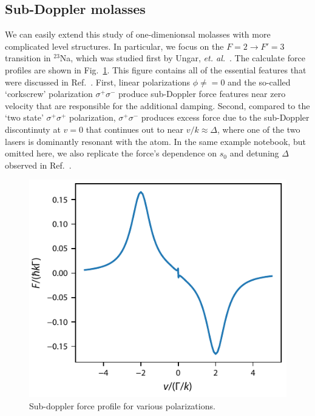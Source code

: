 \documentclass[final,5p,times,twocolumn]{elsarticle}
\begin{document}
\subsection{Sub-Doppler molasses}
We can easily extend this study of one-dimenionsal molasses with more complicated level structures.  In particular, we focus on the $F=2\rightarrow F'=3$ transition in $^{23}$Na, which was studied first by Ungar, {\it et. al.}~\cite{Ungar1989}.  The calculate force profiles are shown in Fig.~\ref{fig:sub_doppler_force}.  This figure contains all of the essential features that were discussed in Ref.~\cite{Ungar1989}.  First, linear polarizations $\phi\neq=0$ and the so-called `corkscrew' polarization $\sigma^+\sigma^-$ produce sub-Doppler force features near zero velocity that are responsible for the additional damping.  Second, compared to the `two state' $\sigma^+\sigma^+$ polarization, $\sigma^+\sigma^-$ produces excess force due to the sub-Doppler discontinuty at $v=0$ that continues out to near $v/k\approx \Delta$, where one of the two lasers is dominantly resonant with the atom.  In the same example notebook, but omitted here, we also replicate the force's dependence on $s_0$ and detuning $\Delta$ observed in Ref.~\cite{Ungar1989}.

\begin{figure}
	\center
	\includegraphics{figs/F2_to_F3_subDoppler_force}
	\caption{\label{fig:sub_doppler_force} Sub-doppler force profile for various polarizations.}
\end{figure}
\end{document}
